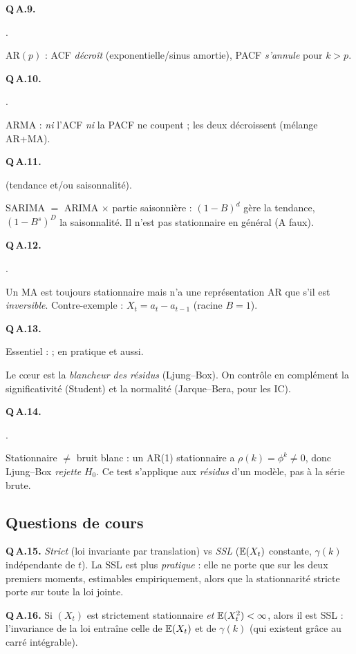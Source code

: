 \documentclass[11pt]{article}
\begin{document}
\textbf{Q\,A.9.} \begin{reponse}.\end{reponse}
AR$(p)$ : ACF \emph{décroît} (exponentielle/sinus amortie), PACF \emph{s'annule} pour $k>p$.

\textbf{Q\,A.10.} \begin{reponse}.\end{reponse}
ARMA : \emph{ni} l'ACF \emph{ni} la PACF ne coupent ; les deux décroissent (mélange AR+MA).

\textbf{Q\,A.11.} \begin{reponse} (tendance et/ou saisonnalité).\end{reponse}
SARIMA $=$ ARIMA $\times$ partie saisonnière : $(1-B)^d$ gère la tendance, $(1-B^s)^D$ la
saisonnalité. Il n'est pas stationnaire en général (A faux).

\textbf{Q\,A.12.} \begin{reponse}.\end{reponse}
Un MA est toujours stationnaire mais n'a une représentation AR que s'il est \emph{inversible}.
Contre-exemple : $X_t=a_t-a_{t-1}$ (racine $B=1$).

\textbf{Q\,A.13.} \begin{reponse}Essentiel :  ; en pratique  et 
aussi.\end{reponse}
Le c\oe ur est la \emph{blancheur des résidus} (Ljung--Box). On contrôle en complément la
significativité (Student) et la normalité (Jarque--Bera, pour les IC).

\textbf{Q\,A.14.} \begin{reponse}.\end{reponse}
Stationnaire $\ne$ bruit blanc : un AR(1) stationnaire a $\rho(k)=\phi^k\ne0$, donc Ljung--Box
\emph{rejette} $H_0$. Ce test s'applique aux \emph{résidus} d'un modèle, pas à la série brute.

\subsection*{Questions de cours}

\textbf{Q\,A.15.} \emph{Strict} (loi invariante par translation) vs \emph{SSL} ($\mathbb{E}(X_t)$
constante, $\gamma(k)$ indépendante de $t$). La SSL est plus \emph{pratique} : elle ne porte
que sur les deux premiers moments, estimables empiriquement, alors que la stationnarité stricte
porte sur toute la loi jointe.

\textbf{Q\,A.16.} Si $(X_t)$ est strictement stationnaire \emph{et} $\mathbb{E}(X_t^2)<\infty$, alors
il est SSL : l'invariance de la loi entraîne celle de $\mathbb{E}(X_t)$ et de $\gamma(k)$ (qui existent
grâce au carré intégrable).
\end{document}
